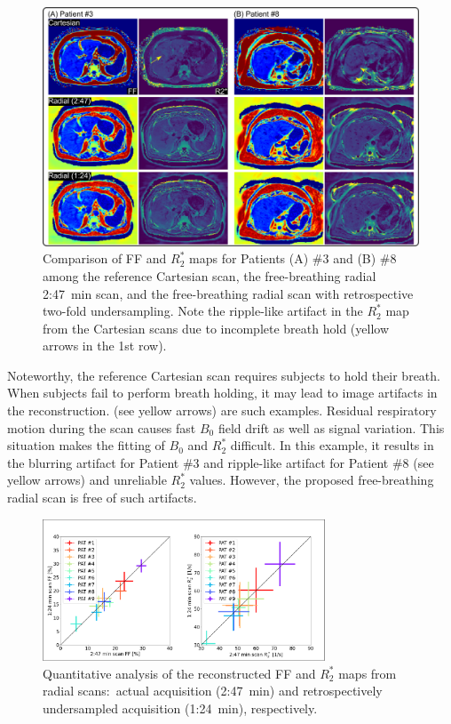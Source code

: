 \documentclass[journal,twoside,web]{ieeecolor}
\begin{document}
\begin{figure}
	\centering
	\includegraphics[width=\textwidth]{../../figures/tan10.pdf}
	\caption{Comparison of FF and $R_2^*$ maps for Patients (A) \#3 and (B) \#8 
		among the reference Cartesian scan, 
		the free-breathing radial 2:47~min scan, 
		and the free-breathing radial scan with retrospective two-fold undersampling. 
		Note the ripple-like artifact in the $R_2^*$ map from the Cartesian scans 
		due to incomplete breath hold (yellow arrows in the 1st row).}
	\label{FIG:R2STAR}
\end{figure}

Noteworthy, the reference Cartesian scan requires subjects to hold their breath. 
When subjects fail to perform breath holding, 
it may lead to image artifacts in the reconstruction. 
 (see yellow arrows) are such examples. 
Residual respiratory motion during the scan 
causes fast $B_0$ field drift \cite{tan_2019_mobawf} 
as well as signal variation. 
This situation makes the fitting of $B_0$ and $R_2^*$ difficult. 
In this example, it results in the blurring artifact for Patient \#3 
and ripple-like artifact for Patient \#8 (see yellow arrows) 
and unreliable $R_2^*$ values. 
However, the proposed free-breathing radial scan is free of such artifacts.

\begin{figure}
	\centering
	\includegraphics[width=0.75\textwidth]{../../figures/tan11.pdf}
	\caption{Quantitative analysis of the reconstructed FF and $R_2^*$ maps 
		from radial scans:~actual acquisition (2:47~\si{\minute}) and 
		retrospectively undersampled acquisition (1:24~\si{\minute}), 
		respectively.}
	\label{FIG:USMP}
\end{figure}
\end{document}
